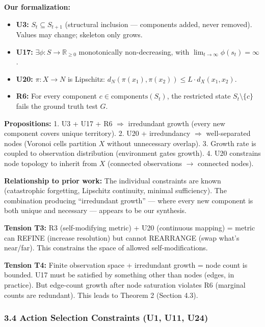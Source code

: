 \documentclass[
  11pt,
]{article}
\providecommand{\tightlist}{%
  \setlength{\itemsep}{0pt}\setlength{\parskip}{0pt}}
\begin{document}
\textbf{Our formalization:}

\begin{itemize}
\tightlist
\item
  \textbf{U3:} \(S_t \subseteq S_{t+1}\) (structural inclusion ---
  components added, never removed). Values may change; skeleton only
  grows.
\item
  \textbf{U17:} \(\exists \phi: S \to \mathbb{R}_{\geq 0}\)
  monotonically non-decreasing, with
  \(\lim_{t \to \infty} \phi(s_t) = \infty\).
\item
  \textbf{U20:} \(\pi: X \to N\) is Lipschitz:
  \(d_N(\pi(x_1), \pi(x_2)) \leq L \cdot d_X(x_1, x_2)\).
\item
  \textbf{R6:} For every component \(c \in \text{components}(S_t)\), the
  restricted state \(S_t \setminus \{c\}\) fails the ground truth test
  \(G\).
\end{itemize}

\textbf{Propositions:} 1. U3 + U17 + R6 \(\Rightarrow\) irredundant
growth (every new component covers unique territory). 2. U20 +
irredundancy \(\Rightarrow\) well-separated nodes (Voronoi cells
partition \(X\) without unnecessary overlap). 3. Growth rate is coupled
to observation distribution (environment gates growth). 4. U20
constrains node topology to inherit from \(X\) (connected observations
\(\to\) connected nodes).

\textbf{Relationship to prior work:} The individual constraints are
known (catastrophic forgetting, Lipschitz continuity, minimal
sufficiency). The combination producing ``irredundant growth'' --- where
every new component is both unique and necessary --- appears to be our
synthesis.

\textbf{Tension T3:} R3 (self-modifying metric) + U20 (continuous
mapping) = metric can REFINE (increase resolution) but cannot REARRANGE
(swap what's near/far). This constrains the space of allowed
self-modifications.

\textbf{Tension T4:} Finite observation space + irredundant growth =
node count is bounded. U17 must be satisfied by something other than
nodes (edges, in practice). But edge-count growth after node saturation
violates R6 (marginal counts are redundant). This leads to Theorem 2
(Section 4.3).

\subsubsection{3.4 Action Selection Constraints (U1, U11,
U24)}\label{action-selection-constraints-u1-u11-u24}
\end{document}
